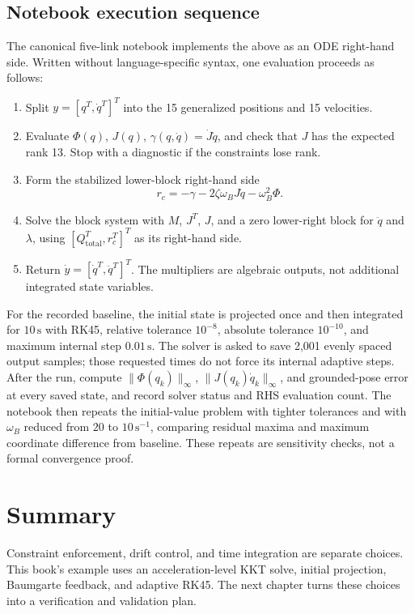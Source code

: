 \documentclass[../main.tex]{subfiles}
\begin{document}
\subsection{Notebook execution sequence}

The canonical five-link notebook implements the above as an ODE right-hand side. Written without language-specific syntax, one evaluation proceeds as follows:
\begin{enumerate}
\item Split $y=[q^T,\dot q^T]^T$ into the 15 generalized positions and 15 velocities.
\item Evaluate $\Phi(q)$, $J(q)$, $\gamma(q,\dot q)=\dot J\dot q$, and check that $J$ has the expected rank 13. Stop with a diagnostic if the constraints lose rank.
\item Form the stabilized lower-block right-hand side
\begin{equation}
r_c=-\gamma-2\zeta\omega_BJ\dot q-\omega_B^2\Phi.
\label{eq:five-link-stabilized-rhs-ch9}
\end{equation}
\item Solve the block system with $M$, $J^T$, $J$, and a zero lower-right block for $\ddot q$ and $\lambda$, using $[Q_{\mathrm{total}}^T,r_c^T]^T$ as its right-hand side.
\item Return $\dot y=[\dot q^T,\ddot q^T]^T$. The multipliers are algebraic outputs, not additional integrated state variables.
\end{enumerate}

For the recorded baseline, the initial state is projected once and then integrated for $10\,\mathrm{s}$ with RK45, relative tolerance $10^{-8}$, absolute tolerance $10^{-10}$, and maximum internal step $0.01\,\mathrm{s}$. The solver is asked to save 2,001 evenly spaced output samples; those requested times do not force its internal adaptive steps. After the run, compute $\|\Phi(q_k)\|_\infty$, $\|J(q_k)\dot q_k\|_\infty$, and grounded-pose error at every saved state, and record solver status and RHS evaluation count. The notebook then repeats the initial-value problem with tighter tolerances and with $\omega_B$ reduced from $20$ to $10\,\mathrm{s}^{-1}$, comparing residual maxima and maximum coordinate difference from baseline. These repeats are sensitivity checks, not a formal convergence proof.

\section{Summary}
Constraint enforcement, drift control, and time integration are separate choices. This book's example uses an acceleration-level KKT solve, initial projection, Baumgarte feedback, and adaptive RK45. The next chapter turns these choices into a verification and validation plan.

\ifSubfilesClassLoaded{\backmatter\bookbibliography}{}
\end{document}

